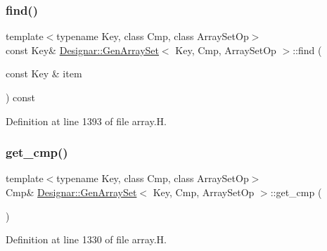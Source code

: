 \subsubsection{\texorpdfstring{find()}{find()}\hspace{0.1cm}{\footnotesize\ttfamily [2/2]}}
{\footnotesize\ttfamily template$<$typename Key, class Cmp, class Array\+Set\+Op$>$ \\
const Key\& \hyperlink{class_designar_1_1_gen_array_set}{Designar\+::\+Gen\+Array\+Set}$<$ Key, Cmp, Array\+Set\+Op $>$\+::find (\begin{DoxyParamCaption}\item[{const Key \&}]{item }\end{DoxyParamCaption}) const\hspace{0.3cm}{\ttfamily [inline]}}



Definition at line 1393 of file array.\+H.

\mbox{\label{class_designar_1_1_gen_array_set_aceb48fb98d254005b82fd538b6ac0c35}} 
\subsubsection{\texorpdfstring{get\+\_\+cmp()}{get\_cmp()}\hspace{0.1cm}{\footnotesize\ttfamily [1/2]}}
{\footnotesize\ttfamily template$<$typename Key, class Cmp, class Array\+Set\+Op$>$ \\
Cmp\& \hyperlink{class_designar_1_1_gen_array_set}{Designar\+::\+Gen\+Array\+Set}$<$ Key, Cmp, Array\+Set\+Op $>$\+::get\+\_\+cmp (\begin{DoxyParamCaption}{ }\end{DoxyParamCaption})\hspace{0.3cm}{\ttfamily [inline]}}



Definition at line 1330 of file array.\+H.

\mbox{\label{class_designar_1_1_gen_array_set_a30409051572881ed638f79debfad8188}} 
